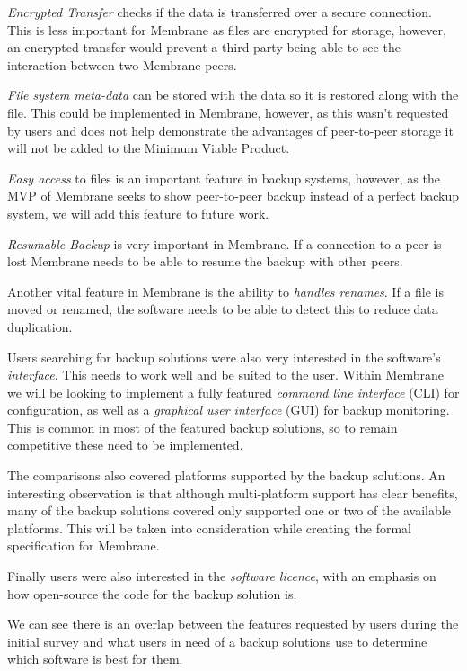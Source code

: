 \documentclass[11pt, a4paper, twocolumn, twoside]{report}
\begin{document}
\emph{Encrypted Transfer} checks if the data is transferred over a secure connection. This is less important for Membrane as files are encrypted for storage, however, an encrypted transfer would prevent a third party being able to see the interaction between two Membrane peers.

\emph{File system meta-data} can be stored with the data so it is restored along with the file. This could be implemented in Membrane, however, as this wasn't requested by users and does not help demonstrate the advantages of peer-to-peer storage it will not be added to the Minimum Viable Product.

\emph{Easy access} to files is an important feature in backup systems, however, as the MVP of Membrane seeks to show peer-to-peer backup instead of a perfect backup system, we will add this feature to future work.

\emph{Resumable Backup} is very important in Membrane. If a connection to a peer is lost Membrane needs to be able to resume the backup with other peers.

Another vital feature in Membrane is the ability to \emph{handles renames}. If a file is moved or renamed, the software needs to be able to detect this to reduce data duplication.

Users searching for backup solutions were also very interested in the software's \emph{interface}. This needs to work well and be suited to the user. Within Membrane we will be looking to implement a fully featured \emph{command line interface} (CLI) for configuration, as well as a \emph{graphical user interface}  (GUI) for backup monitoring. This is common in most of the featured backup solutions, so to remain competitive these need to be implemented.

The comparisons also covered platforms supported by the backup solutions. An interesting observation is that although multi-platform support has clear benefits, many of the backup solutions covered only supported one or two of the available platforms. This will be taken into consideration while creating the formal specification for Membrane.

Finally users were also interested in the \emph{software licence}, with an emphasis on how open-source the code for the backup solution is.

We can see there is an overlap between the features requested by users during the initial survey and what users in need of a backup solutions use to determine which software is best for them.
\end{document}
